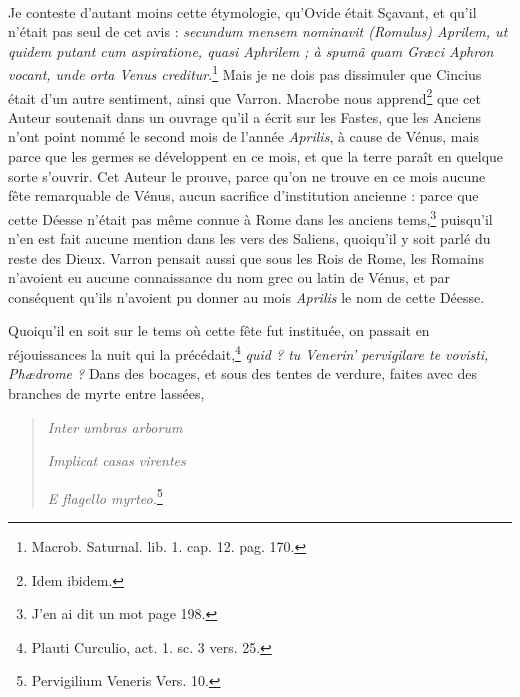 \documentclass[a4paper, 11pt, oneside, polutonikogreek, french]{article}
\begin{document}
\paragraph{}
Je conteste d'autant moins cette étymologie, qu'Ovide était Sçavant, et qu'il n'était pas seul de cet avis : \emph{secundum mensem nominavit (Romulus) Aprilem, ut quidem putant cum aspiratione, quasi Aphrilem ; à spumâ quam Græci Aphron vocant, unde orta Venus creditur}.\footnote{Macrob. Saturnal. lib. 1. cap. 12. pag. 170.} Mais je ne dois pas dissimuler que Cincius était d'un autre sentiment, ainsi que Varron. Macrobe nous apprend\footnote{Idem ibidem.} que cet Auteur soutenait dans un ouvrage qu'il a écrit sur les Fastes, que les Anciens n'ont point nommé le second mois de l'année \emph{Aprilis}, à cause de Vénus, mais parce que les germes se développent en ce mois, et que la terre paraît en quelque sorte s'ouvrir. Cet Auteur le prouve, parce qu'on ne trouve en ce mois aucune fête remarquable de Vénus, aucun sacrifice d'institution ancienne : parce que cette Déesse n'était pas même connue à Rome dans les anciens tems,\footnote{J'en ai dit un mot page 198.} puisqu'il n'en est fait aucune mention dans les vers des Saliens, quoiqu'il y soit parlé du reste des Dieux. Varron pensait aussi que sous les Rois de Rome, les Romains n'avoient eu aucune connaissance du nom grec ou latin de Vénus, et par conséquent qu'ils n'avoient pu donner au mois \emph{Aprilis} le nom de cette Déesse.

Quoiqu'il en soit sur le tems où cette fête fut instituée, on passait en réjouissances la nuit qui la précédait,\footnote{Plauti Curculio, act. 1. sc. 3 vers. 25.} \emph{quid ? tu Venerin' pervigilare te vovisti, Phædrome ?} Dans des bocages, et sous des tentes de verdure, faites avec des branches de myrte entre lassées,
\begin{quotation}
\hspace*{5mm}\emph{Inter umbras arborum}

\emph{Implicat casas virentes}

\hspace*{5mm}\emph{E flagello myrteo.}\footnote{Pervigilium Veneris Vers. 10.}
\end{quotation}
\end{document}
